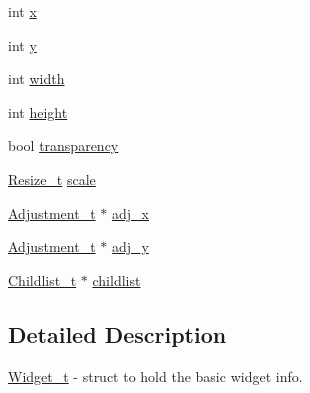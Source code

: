 \begin{DoxyCompactItemize}
\item 
int \hyperlink{structWidget__t_aac6ce7621b682bb4ce88bac9181c34a7}{x}
\item 
int \hyperlink{structWidget__t_acb9402de44e47837e1821b93fc052b38}{y}
\item 
int \hyperlink{structWidget__t_a3204c88196ed5793250b3530dd719037}{width}
\item 
int \hyperlink{structWidget__t_a1def6d2237743e75a0b84ca0c34a6834}{height}
\item 
bool \hyperlink{structWidget__t_a42a597c21eca964c0296fc7026feb43b}{transparency}
\item 
\hyperlink{structResize__t}{Resize\+\_\+t} \hyperlink{structWidget__t_a9a2d5b53f40f5bf3914fc0694027d7ec}{scale}
\item 
\hyperlink{structAdjustment__t}{Adjustment\+\_\+t} $\ast$ \hyperlink{structWidget__t_aabc05e0a46c85d24483fae36127b45dd}{adj\+\_\+x}
\item 
\hyperlink{structAdjustment__t}{Adjustment\+\_\+t} $\ast$ \hyperlink{structWidget__t_abde95d3fb49faff5dd852f16810115e7}{adj\+\_\+y}
\item 
\hyperlink{structChildlist__t}{Childlist\+\_\+t} $\ast$ \hyperlink{structWidget__t_ac203ccbc58958a7c205897d4aba197e9}{childlist}
\end{DoxyCompactItemize}


\subsection{Detailed Description}
\hyperlink{structWidget__t}{Widget\+\_\+t} -\/ struct to hold the basic widget info. 


